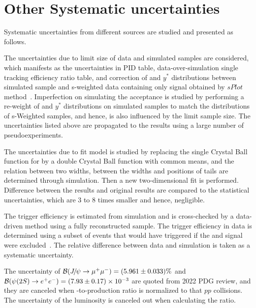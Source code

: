 \section{Other Systematic uncertainties}
\label{Systematic uncertainty}
Systematic uncertainties from different sources are studied and presented as follows.

The uncertainties due to limit size of data and simulated samples are considered, which manifests as the uncertainties in PID table, data-over-simulation single tracking efficiency ratio table, and correction of \pt and $y^*$ distributions between simulated sample and s-weighted data containing only signal obtained by $sPlot$ method~\cite{Pivk:2004ty}. Imperfection on simulating the acceptance is studied by performing a re-weight of \pt and $y^*$ distributions on simulated samples to match the distributions of s-Weighted samples, and hence, is also influenced by the limit sample size. The uncertainties listed above are propagated to the results using a large number of pseudoexperiments.

The uncertainties due to fit model is studied by replacing the single Crystal Ball function for \psitwos by a double Crystal Ball function with common means, and the relation between two widths, between the widths and positions of tails are determined through simulation. Then a new two-dimensional fit is performed. Difference between the results and original results are compared to the statistical uncertainties, which are 3 to 8 times smaller and hence, negligible.

The trigger efficiency is estimated from simulation and is cross-checked by a data-driven method using a fully reconstructed sample. The trigger efficiency in data is determined using a subset of events that would have triggered if the \jpsi and \psitwos signal were excluded~\cite{LHCb-DP-2012-004}. The relative difference between data and simulation is taken as a systematic uncertainty.

The uncertainty of ${\mathcal{B}}({{J\mskip -3mu/\mskip -2mu\psi}}\rightarrow\mu^+\mu^-)=(5.961\pm0.033)\%$ and  ${\mathcal{B}}({\psi{(2S)}}\rightarrow e^+e^-)=(7.93\pm0.17)\times10^{-3}$ are quoted from 2022 PDG review, and they are canceled when \psitwos-to-\jpsi production ratio is normalized to that $pp$ collisions. The uncertainty of the luminosity is canceled out when calculating the ratio. 

